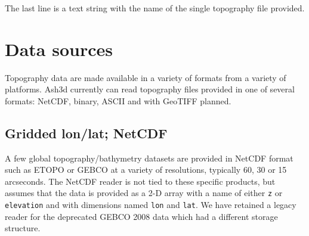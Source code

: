 The last line is a text string with the name of the single topography file
provided.

\section{Data sources}\label{ChapAppendTopo_Sec_Data}
Topography data are made available in a variety of formats from a variety
of platforms. Ash3d currently can read topography files provided in one of
several formats: NetCDF, binary, ASCII and with GeoTIFF planned.
\subsection{Gridded lon/lat; NetCDF}
A few global topography/bathymetry datasets are provided in NetCDF format such
as ETOPO \cite{ETOPO2022} or GEBCO \cite{GEBCO2024} at a variety of resolutions, typically
60, 30 or 15 arcseconds. The NetCDF reader is not tied to these specific products,
but assumes that the data is provided as a 2-D array with a name of either
\texttt{z} or \texttt{elevation} and with dimensions named \texttt{lon} and
\texttt{lat}. We have retained a legacy reader for the deprecated GEBCO 2008
data which had a different storage structure.
